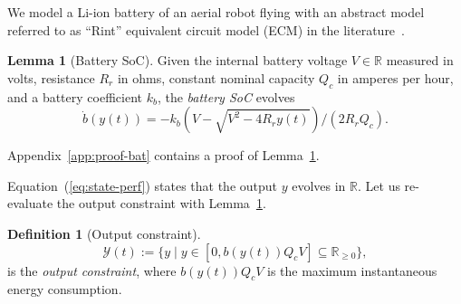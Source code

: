 \documentclass[letterpaper,10pt,journal,twoside]{IEEEtran}
\theoremstyle{definition}
\newtheorem{lem}[thm]{Lemma}
\newtheorem{defn}{Definition}[section]
\begin{document}
We model a Li-ion battery of an aerial robot flying with an abstract model referred to as ``Rint'' equivalent circuit model (ECM) in the literature~\cite{he2011evaluation,hinz2019comparison,mousavi2014various}.

\begin{lem}[Battery SoC]\label{lem:bat}
  Given the internal battery voltage $V\in\mathbb{R}$ measured in volts, resistance $R_r$ in ohms, constant nominal capacity $Q_c$ in amperes per hour, and a battery coefficient $k_b$, the \emph{battery SoC} evolves
  \begin{equation*}
    \dot{b}(y(t))=-k_b\left(V-
  \sqrt{
    V^2-
    4R_ry(t)}
  \right)/(2R_rQ_c).
  \end{equation*}
\end{lem}

Appendix~\ref{app:proof-bat} contains a proof of Lemma~\ref{lem:bat}. 

Equation~(\ref{eq:state-perf}) states that the output $y$ evolves in $\mathbb{R}$. Let us re-evaluate the output constraint with Lemma~\ref{lem:bat}.

\begin{defn}[Output constraint]
  \label{def:const}
  \begin{equation*}
    \mathcal{Y}(t):=\{y\mid y\in[0,b(y(t))Q_cV]\subseteq{\mathbb{R}_{\geq 0}}\},
  \end{equation*}
  is the \emph{output constraint}, where $b(y(t))Q_cV$ is the maximum instantaneous energy consumption.
\end{defn}



\end{document}
